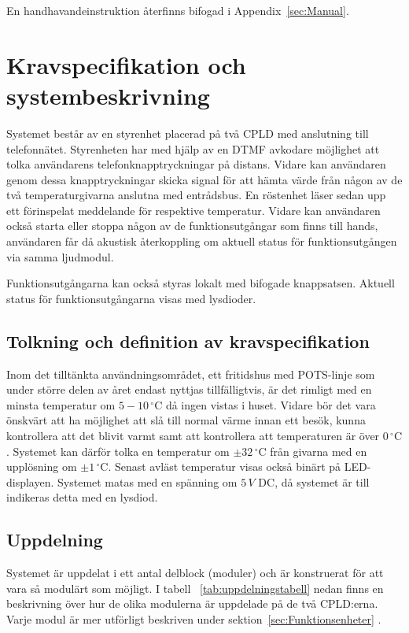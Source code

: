 \documentclass[a4paper,11pt]{article}
\begin{document}
	En handhavandeinstruktion återfinns bifogad i Appendix~\ref{sec:Manual}.

\pagebreak

\section{Kravspecifikation och systembeskrivning}
	Systemet består av en styrenhet placerad på två CPLD med anslutning till telefonnätet. Styrenheten har med hjälp av en DTMF avkodare möjlighet att tolka användarens telefonknapptryckningar på distans. Vidare kan användaren genom dessa knapptryckningar skicka signal för att hämta värde från någon av de två temperaturgivarna anslutna med entrådsbus. En röstenhet läser sedan upp ett förinspelat meddelande för respektive temperatur. Vidare kan användaren också starta eller stoppa någon av de funktionsutgångar som finns till hands, användaren får då akustisk återkoppling om aktuell status för funktionsutgången via samma ljudmodul.

Funktionsutgångarna kan också styras lokalt med bifogade knappsatsen. Aktuell status för funktionsutgångarna visas med lysdioder. 

	\subsection{Tolkning och definition av kravspecifikation}

		Inom det tilltänkta användningsområdet, ett fritidshus med POTS-linje som under större delen av året endast nyttjas tillfälligtvis, är det rimligt med en minsta temperatur om $5-10\,^{\circ}\mathrm{C}$ då ingen vistas i huset. Vidare bör det vara önskvärt att ha möjlighet att slå till normal värme innan ett besök, kunna kontrollera att det blivit varmt samt att kontrollera att temperaturen är över $0\,^{\circ}\mathrm{C}$. Systemet kan därför tolka en temperatur om $\pm 32\,^{\circ}\mathrm{C}$ från givarna med en upplösning om $\pm 1\,^{\circ}\mathrm{C}$. Senast avläst temperatur visas också binärt på LED-displayen. Systemet matas med en spänning om $5\,V$ DC, då systemet är till indikeras detta med en lysdiod.

	\subsection{Uppdelning}

	Systemet är uppdelat i ett antal delblock (moduler) och är konstruerat för att vara så modulärt som möjligt.
	I tabell ~\ref{tab:uppdelningstabell} nedan finns en beskrivning över hur de olika modulerna är uppdelade på de två CPLD:erna. Varje modul är mer
	utförligt beskriven under sektion~\ref{sec:Funktionsenheter} . 
\end{document}
